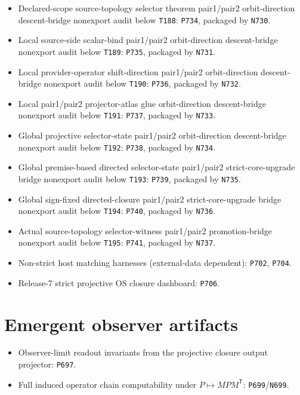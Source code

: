\documentclass[11pt,a4paper]{article}
\begin{document}
\begin{itemize}
  \item Declared-scope source-topology selector theorem pair1/pair2 orbit-direction descent-bridge nonexport audit below \texttt{T188}: \texttt{P734}, packaged by \texttt{N730}.
  \item Local source-side scalar-bind pair1/pair2 orbit-direction descent-bridge nonexport audit below \texttt{T189}: \texttt{P735}, packaged by \texttt{N731}.
  \item Local provider-operator shift-direction pair1/pair2 orbit-direction descent-bridge nonexport audit below \texttt{T190}: \texttt{P736}, packaged by \texttt{N732}.
  \item Local pair1/pair2 projector-atlas glue orbit-direction descent-bridge nonexport audit below \texttt{T191}: \texttt{P737}, packaged by \texttt{N733}.
  \item Global projective selector-state pair1/pair2 orbit-direction descent-bridge nonexport audit below \texttt{T192}: \texttt{P738}, packaged by \texttt{N734}.
  \item Global premise-based directed selector-state pair1/pair2 strict-core-upgrade bridge nonexport audit below \texttt{T193}: \texttt{P739}, packaged by \texttt{N735}.
  \item Global sign-fixed directed-closure pair1/pair2 strict-core-upgrade bridge nonexport audit below \texttt{T194}: \texttt{P740}, packaged by \texttt{N736}.
  \item Actual source-topology selector-witness pair1/pair2 promotion-bridge nonexport audit below \texttt{T195}: \texttt{P741}, packaged by \texttt{N737}.
  \item Non-strict host matching harnesses (external-data dependent): \texttt{P702}, \texttt{P704}.
  \item Release-7 strict projective OS closure dashboard: \texttt{P706}.
\end{itemize}
\section{Emergent observer artifacts}

\begin{itemize}
  \item Observer-limit readout invariants from the projective closure output projector: \texttt{P697}.
  \item Full induced operator chain computability under $P\mapsto MPM^{\mathsf T}$: \texttt{P699}/\texttt{N699}.
\end{itemize}
\end{document}
